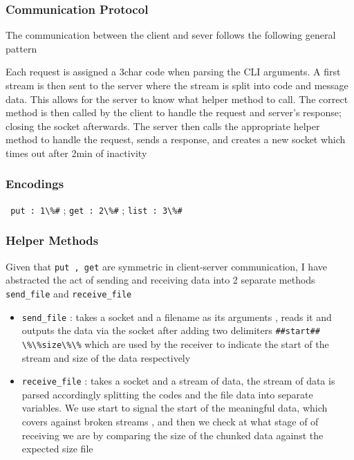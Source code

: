 \documentclass[english,course]{Notes}
\begin{document}
\subsubsection{Communication Protocol}

\par{The communication between the client and sever follows the following general pattern}

\par{Each request is assigned a 3char code when parsing the CLI arguments. A first stream is then sent to the server where the stream is split into code and message data. This allows for the server to know what helper method to call. The correct method is then called by the client to handle the request and server's response; closing the socket afterwards.  The server then calls the appropriate helper method to handle the request, sends a response, and creates a new socket which times out after 2min of inactivity }

\subsubsection{Encodings}

\verb! put : 1\%#! ;
\verb!get : 2\%#! ;
\verb!list : 3\%#!

\subsubsection{Helper Methods}

\par{Given that \verb!put , get! are symmetric in client-server communication, I have abstracted the act of sending and receiving data into 2 separate methods \verb!send_file! and \verb!receive_file!}

\begin{itemize}
	\item[] \verb!send_file! : takes a socket and a filename as its arguments , reads it and outputs the data via the socket after adding two delimiters \verb!##start##! \verb!\%\%size\%\%! which  are used by the receiver to indicate the start of the stream and size of the data respectively 
	
	\item[] \verb!receive_file! : takes a socket and a stream of data, the stream of data is parsed accordingly splitting the codes and the file data into separate variables. We use start to signal the start of the meaningful data, which covers against broken streams , and then we check at what stage of of receiving we are by comparing the size of the chunked data against the expected size file

\end{itemize}
\end{document}
